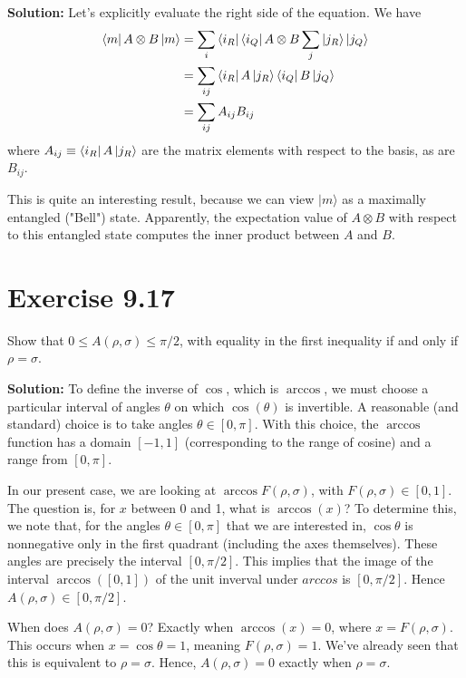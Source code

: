 \documentclass{book}
\begin{document}
    \textbf{Solution:} Let's explicitly evaluate the right side of the equation. We have
    \begin{align}
    \begin{aligned}
        \bra{m} A \otimes B \ket{m} &= \sum_{i} \bra{i_R}\bra{i_Q} A \otimes B \sum_j \ket{j_R}\ket{j_Q} \\
        &= \sum_{ij} \bra{i_R}A\ket{j_R} \bra{i_Q}B\ket{j_Q} \\
        &= \sum_{ij} A_{ij} B_{ij} 
    \end{aligned}
    \end{align}
    where $A_{ij} \equiv \bra{i_R}A\ket{j_R}$ are the matrix elements with respect to the basis, as are $B_{ij}$. 

    This is quite an interesting result, because we can view $\vert m \rangle$ as a maximally entangled ("Bell") state. Apparently, the expectation value of $A \otimes B$ with respect to this entangled state computes the inner  product between $A$ and $B$. 

\section*{Exercise 9.17}
    Show that $0 \leq A(\rho, \sigma) \leq \pi/2$, with equality in the first inequality if and only if $\rho = \sigma$.

    \textbf{Solution:} To define the inverse of $\cos$, which is $\arccos$, we must choose a particular interval of angles $\theta$ on which $\cos(\theta)$ is invertible. A reasonable (and standard) choice is to take angles $\theta \in [0,\pi]$. With this choice, the $\arccos$ function has a domain $[-1,1]$ (corresponding to the range of cosine) and a range from $[0,\pi]$.

    In our present case, we are looking at $\arccos F(\rho, \sigma)$, with $F(\rho, \sigma) \in [0,1]$. The question is, for $x$ between 0 and 1, what is $\arccos(x)$? To determine this, we note that, for the angles $\theta \in [0,\pi]$ that we are interested in, $\cos \theta$ is nonnegative only in the first quadrant (including the axes themselves). These angles are precisely the interval $[0,\pi/2]$. This implies that the image of the interval $\arccos ([0,1])$ of the unit inverval under $arccos$ is  $[0,\pi/2]$. Hence $A(\rho, \sigma) \in [0,\pi/2]$. 

    When does $A(\rho, \sigma) = 0$? Exactly when $\arccos(x) = 0$, where $x = F(\rho, \sigma)$. This occurs when $x = \cos\theta = 1$, meaning $F(\rho, \sigma) = 1$. We've already seen that this is equivalent to $\rho = \sigma$. Hence, $A(\rho, \sigma) = 0$ exactly when $\rho = \sigma$.
\end{document}
